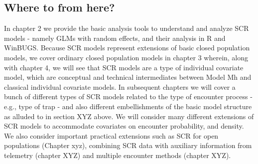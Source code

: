 \subsection{Where to from here?}

In chapter 2 we provide the basic analysis tools to understand and
analyze SCR models - namely GLMs with random effects, and their
analysis in R and WinBUGS.  Because SCR models represent extensions of
basic closed population models, we cover ordinary closed population
models in chapter 3 wherein, along with chapter 4, we will see that
SCR models are a type of individual covariate model, which are
conceptual and technical intermediates between Model Mh and classical
individual covariate models.  In subsequent chapters we will cover a
bunch of different types of SCR models related to the type of
encounter process - e.g., type of trap - and also different
embellishments of the basic model structure as alluded to in section
XYZ above.  We will consider many different extensions of SCR models
to accommodate covariates on encounter probability, and density. We
also consider important practical extensions such as SCR for open
populations (Chapter xyz), combining SCR data with auxiliary
information from telemetry (chapter XYZ) and multiple encounter
methods (chapter XYZ).
